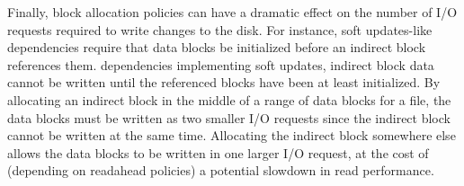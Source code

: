 Finally, block allocation policies can have a dramatic effect on the number of
I/O requests required to write changes to the disk. For instance, soft
updates-like dependencies require that data blocks be initialized before
an indirect block references them.   
dependencies implementing soft updates, indirect block data cannot be written
until the referenced blocks have been at least initialized. By allocating an
indirect block in the middle of a range of data blocks for a file, the data
blocks must be written as two smaller I/O requests since the indirect block
cannot be written at the same time. Allocating the indirect block somewhere
else allows the data blocks to be written in one larger I/O request, at the
cost of (depending on readahead policies) a potential slowdown in read performance.


\begin{comment}
Several functions in \Kudos\ iterate over lists of \patches\ looking for either
a single \patch\ or set of \patches\ satisfying some property, or trying to
process all the \patches\ in the list in some order determined by the dependency
graph. It is generally the case that the \patches\ satisfying the property or
the order in which the \patches\ should be processed can be determined very
quickly by keeping the lists sorted. For instance, the library function which
reverts \patches\ needs to perform the revert operations essentially in inverse
creation order, so that reverting a \patch\ which has since been overwritten
by a later \patch\ does the right thing. Keeping the list of all \patches\ on a
block sorted in creation order (which is very easy) makes this an efficient
operation, while it might otherwise take $O(n^2)$ time to execute. Similarly,
many \patch\ merging functions need to find for a given block some \patch\
which has no \befores\ on the same block, and the oldest \patch\ on a block
always satisfies this requirement.
\end{comment}
